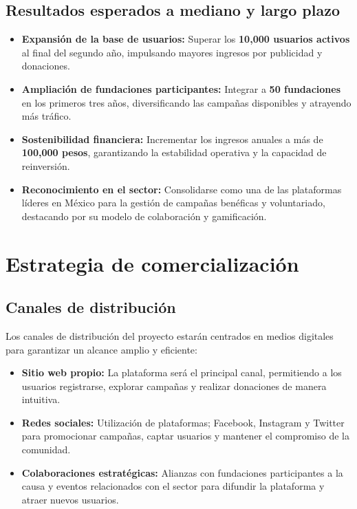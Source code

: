 \documentclass[a4paper,12pt]{article}
\begin{document}
\subsection{Resultados esperados a mediano y largo plazo}
\begin{itemize}\setlength{\itemsep}{0pt}\setlength{\parskip}{1pt}
    \item \textbf{Expansión de la base de usuarios:} Superar los \textbf{10,000 usuarios activos} al final del segundo año, impulsando mayores ingresos por publicidad y donaciones.
    \item \textbf{Ampliación de fundaciones participantes:} Integrar a \textbf{50 fundaciones} en los primeros tres años, diversificando las campañas disponibles y atrayendo más tráfico.
    \item \textbf{Sostenibilidad financiera:} Incrementar los ingresos anuales a más de \textbf{100,000 pesos}, garantizando la estabilidad operativa y la capacidad de reinversión.
    \item \textbf{Reconocimiento en el sector:} Consolidarse como una de las plataformas líderes en México para la gestión de campañas benéficas y voluntariado, destacando por su modelo de colaboración y gamificación.
\end{itemize}

\section{Estrategia de comercialización}

\subsection{Canales de distribución}
Los canales de distribución del proyecto estarán centrados en medios digitales para garantizar un alcance amplio y eficiente:
\begin{itemize}\setlength{\itemsep}{0pt}\setlength{\parskip}{1pt}
    \item \textbf{Sitio web propio:} La plataforma será el principal canal, permitiendo a los usuarios registrarse, explorar campañas y realizar donaciones de manera intuitiva.
    \item \textbf{Redes sociales:} Utilización de plataformas; Facebook, Instagram y Twitter para promocionar campañas, captar usuarios y mantener el compromiso de la comunidad.
    \item \textbf{Colaboraciones estratégicas:} Alianzas con fundaciones participantes a la causa y eventos relacionados con el sector para difundir la plataforma y atraer nuevos usuarios.
\end{itemize}
\end{document}
